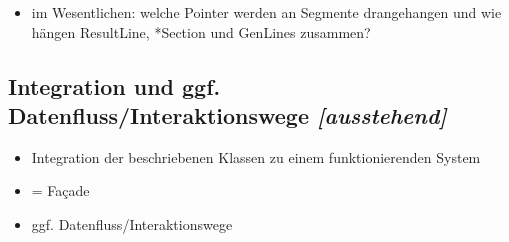 \documentclass[../main/thesis.tex]{subfiles}
\begin{document}

\begin{itemize}
\item im Wesentlichen: welche Pointer werden an Segmente drangehangen und wie hängen ResultLine, *Section und GenLines zusammen?
\end{itemize}



\subsection{Integration und ggf. Datenfluss/Interaktionswege \emph{[ausstehend]}}

\begin{itemize}
\item Integration der beschriebenen Klassen zu einem funktionierenden System
\item {} = Façade
\item ggf. Datenfluss/Interaktionswege
\end{itemize}




\end{document}
